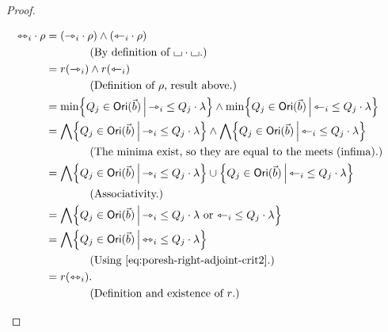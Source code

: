 \documentclass[a4paper]{memoir}
\begin{document}
\begin{proof}
\begin{enumerate}
\begin{itemize}
\begin{align*}
				\equijetsym_i \cdot \rho
				&= (\jetsym_i \cdot \rho) \wedge (\tejsym_i \cdot \rho) \\
				&\qquad \qquad \text{(By definition of $\loch \cdot \loch$.)} \\
				&= r(\jetsym_i) \wedge r(\tejsym_i) \\
				&\qquad \qquad \text{(Definition of $\rho$, result above.)} \\
				&= \min \set{Q_j \in \orisymbol(\vec b)}{\jetsym_i \leq Q_j \cdot \lambda} \wedge \min \set{Q_j \in \orisymbol(\vec b)}{\tejsym_i \leq Q_j \cdot \lambda} \\
				&= \bigwedge \set{Q_j \in \orisymbol(\vec b)}{\jetsym_i \leq Q_j \cdot \lambda} \wedge \bigwedge \set{Q_j \in \orisymbol(\vec b)}{\tejsym_i \leq Q_j \cdot \lambda} \\
				&\qquad \qquad \text{(The minima exist, so they are equal to the meets (infima).)} \\
				&= \bigwedge \set{Q_j \in \orisymbol(\vec b)}{\jetsym_i \leq Q_j \cdot \lambda} \cup \set{Q_j \in \orisymbol(\vec b)}{\tejsym_i \leq Q_j \cdot \lambda} \\
				&\qquad \qquad \text{(Associativity.)} \\
				&= \bigwedge \set{Q_j \in \orisymbol(\vec b)}{\jetsym_i \leq Q_j \cdot \lambda \text{ or } \tejsym_i \leq Q_j \cdot \lambda} \\
				&= \bigwedge \set{Q_j \in \orisymbol(\vec b)}{\equijetsym_i \leq Q_j \cdot \lambda} \\
				&\qquad \qquad \text{(Using \cref{eq:poresh-right-adjoint-crit2}.)} \\
				&= r(\equijet_i). \\
				&\qquad \qquad \text{(Definition and existence of $r$.)} &\qedhere
			\end{align*}

\end{itemize}
\end{enumerate}
\end{proof}
\end{document}
